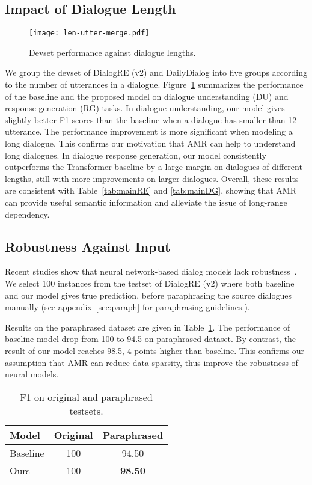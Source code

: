 \documentclass[11pt,a4paper]{article}
\begin{document}
\subsection{Impact of Dialogue Length}
\begin{figure}
\centering
    \small
    \texttt{[image: len-utter-merge.pdf]}
    \caption{Devset performance against dialogue lengths.}
    \label{fig:dialog-len}
\end{figure}
We group the devset of DialogRE (v2) and DailyDialog into five groups according to the number of utterances in a dialogue.
Figure~\ref{fig:dialog-len} summarizes the performance of the baseline and the proposed model on dialogue understanding (DU) and response generation (RG) tasks.
In dialogue understanding, our model gives slightly better F1 scores than the baseline when a dialogue has smaller than 12 utterance. 
The performance improvement is more significant when modeling a long dialogue.
This confirms our motivation that AMR can help to understand long dialogues.
In dialogue response generation, our model consistently outperforms the Transformer baseline by a large margin on dialogues of different lengths, still with more improvements on larger dialogues.
Overall, these results are consistent with Table~\ref{tab:mainRE} and \ref{tab:mainDG}, showing that AMR can provide useful semantic information and alleviate the issue of long-range dependency.




\subsection{Robustness Against Input}
Recent studies show that neural network-based dialog models lack robustness~\cite{Shalyminov18,Einolghozati19}.
We select 100 instances from the testset of DialogRE (v2) where both baseline and our model gives true prediction, before paraphrasing the source dialogues manually (see appendix~\ref{sec:paraph} for paraphrasing guidelines.). 

Results on the paraphrased dataset are given in Table~\ref{tab:robustness}.
The performance of baseline model drop from 100 to 94.5 on paraphrased dataset. 
By contrast, the result of our model reaches 98.5, 4 points higher than baseline.
This confirms our assumption that AMR can reduce data sparsity, thus improve the robustness of neural models.

\begin{table}
	\centering
	\small
	\begin{tabular}{lcc}
		\toprule
		\textbf{Model} & Original & Paraphrased \\
		\midrule 	
		Baseline & 100 & 94.50 \\
		Ours & 100 & \textbf{98.50} \\
		\bottomrule
	\end{tabular}
	\caption{F1 on original and paraphrased testsets.}
	\label{tab:robustness}
\end{table}
\end{document}
